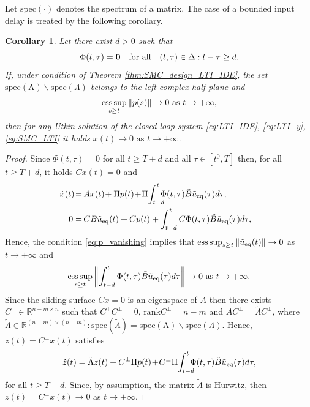 \documentclass{article}
\newcommand{\R}{\mathbb{R}}
\newcommand{\zero}{\mathbf{0}}
\newtheorem{corollary}{Corollary}
\DeclareMathOperator*{\esssup}{ess\,sup}
\begin{document}
Let $\mathrm{spec}(\cdot)$ denotes the spectrum of a matrix.
The  case of a bounded  input delay is treated by the following corollary.
\begin{corollary}\itshape 
Let there exist  $d>0$ such that\vspace{-1mm}
 \begin{equation}\label{eq:Phi_d}
		\Phi(t,\tau)=\zero \quad  \text{for all} \quad  (t,\tau)\in \Delta: t-\tau\geq d.\vspace{-1mm}
	\end{equation} 
	If, under condition of Theorem \ref{thm:SMC_design_LTI_IDE}, the set
	$\mathrm{spec(A)}\backslash\mathrm{spec}(\Lambda)$ belongs to the left complex half-plane and\vspace{-1mm}
	\begin{equation}\label{eq:p_vanishing}
		\esssup_{s\geq t} \|p(s)\|\to 0 \text{ as } t\to +\infty,\vspace{-1mm}
	\end{equation}
	then for any Utkin solution of  the closed-loop system 
	\eqref{eq:LTI_IDE}, \eqref{eq:LTI_y}, \eqref{eq:SMC_LTI}  it holds
$
		x(t)\to 0 \text{ as } t\to +\infty.
$
\end{corollary}
\begin{proof}
	Since $\Phi(t,\tau)=0$ for all $t\geq T+d$ and all $\tau\in [t^0,T]$ then, for all $ t\geq T+d$, it holds $Cx(t)=0$ and\vspace{-1mm}
	\begin{equation}
\begin{split}
	\!\!\!\!\!\dot x(t)\!=&\,Ax(t)\!+\Pi p(t)
	\!+\!\Pi\!\int^t_{t-d} \!\!\!\!\Phi(t,\tau) \tilde B\tilde u_{\rm eq}(\tau)d
	\tau,\\
	0=&\,CB\tilde u_{\rm eq}(t)+Cp(t)+\int^t_{t-d}C\Phi(t,\tau)\tilde B
	\tilde u_{\rm eq} (\tau)d \tau,\vspace{-1mm}
\end{split}
\end{equation}
Hence, the condition \eqref{eq:p_vanishing} implies that $\esssup_{s\geq t}\|\tilde u_{\rm eq}(t)\|\to 0$ as $t\to +\infty$ and $$\esssup_{s\geq t}\left\|\int^t_{t-d} \Phi(t,\tau) \tilde B\tilde u_{\rm eq}(\tau)d
\tau\right\|\to 0 \text{
as }t\to +\infty.$$
Since the sliding surface $Cx=0$ is an eigenspace of $A$  then there exists $C^{\top}\in \R^{n-m\times n}$ such that $C^{\top}C^{\bot}=0$, $\mathrm{rank}{C^{\bot}}=n-m$ and $AC^{\bot}=\tilde \Lambda C^{\bot}$, where $\tilde \Lambda\in \R^{(n-m) \times (n-m)}: \mathrm{spec}(\tilde \Lambda)=\mathrm{spec(A)}\backslash\mathrm{spec}(\Lambda)$. Hence,  $z(t)=C^{\bot}x(t)$ satisfies\vspace{-1mm}
\[
\dot z(t)=\tilde \Lambda z(t)+C^{\bot}\Pi p(t)
\!+\!C^{\bot}\Pi\!\int^t_{t-d} \!\!\!\!\Phi(t,\tau) \tilde B\tilde u_{\rm eq}(\tau)d
\tau,\vspace{-1mm}
\]
for all $ t\geq T+d$.
Since, by assumption, the matrix $\tilde \Lambda$ is Hurwitz,  then
$z(t)=C^{\bot}x(t)\to 0$ as $t\to+\infty$.
\end{proof}
\end{document}
